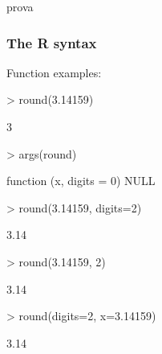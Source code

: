 \documentclass{beamer}
\begin{document}
\begin{frame}[fragile]{prova}
	\frametitle{The R syntax}
	Function examples:
	\vspace{10pt}
	
\begin{Schunk}
\begin{Sinput}
> round(3.14159)
\end{Sinput}
\begin{Soutput}
[1] 3
\end{Soutput}
\begin{Sinput}
> args(round)
\end{Sinput}
\begin{Soutput}
function (x, digits = 0) 
NULL
\end{Soutput}
\begin{Sinput}
> round(3.14159, digits=2)
\end{Sinput}
\begin{Soutput}
[1] 3.14
\end{Soutput}
\begin{Sinput}
> round(3.14159, 2)
\end{Sinput}
\begin{Soutput}
[1] 3.14
\end{Soutput}
\begin{Sinput}
> round(digits=2, x=3.14159)
\end{Sinput}
\begin{Soutput}
[1] 3.14
\end{Soutput}
\end{Schunk}
\end{frame}
\end{document}

